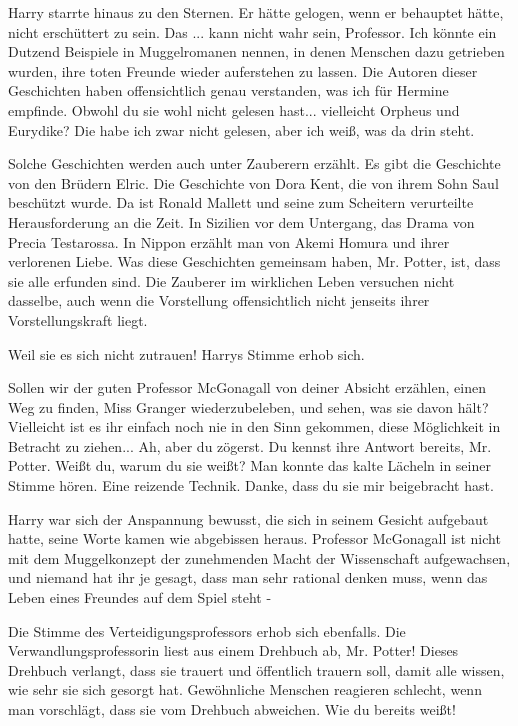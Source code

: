 Harry starrte hinaus zu den Sternen. Er hätte gelogen, wenn er behauptet hätte,
nicht erschüttert zu sein. \glqq{}Das ... kann nicht wahr sein, Professor. Ich
könnte ein Dutzend Beispiele in Muggelromanen nennen, in denen Menschen dazu
getrieben wurden, ihre toten Freunde wieder auferstehen zu lassen. Die Autoren
dieser Geschichten haben offensichtlich genau verstanden, was ich für Hermine
empfinde. Obwohl du sie wohl nicht gelesen hast... vielleicht Orpheus und
Eurydike? Die habe ich zwar nicht gelesen, aber ich weiß, was da drin
steht.\grqq{}

\glqq{}Solche Geschichten werden auch unter Zauberern erzählt. Es gibt die
Geschichte von den Brüdern Elric. Die Geschichte von Dora Kent, die von ihrem
Sohn Saul beschützt wurde. Da ist Ronald Mallett und seine zum Scheitern
verurteilte Herausforderung an die Zeit. In Sizilien vor dem Untergang, das
Drama von Precia Testarossa. In Nippon erzählt man von Akemi Homura und ihrer
verlorenen Liebe. Was diese Geschichten gemeinsam haben, Mr. Potter, ist, dass
sie alle erfunden sind. Die Zauberer im wirklichen Leben versuchen nicht
dasselbe, auch wenn die Vorstellung offensichtlich nicht jenseits ihrer
Vorstellungskraft liegt.\grqq{}

\glqq{}Weil sie es sich nicht zutrauen!\grqq{} Harrys Stimme erhob sich.

\glqq{}Sollen wir der guten Professor McGonagall von deiner Absicht erzählen,
einen Weg zu finden, Miss Granger wiederzubeleben, und sehen, was sie davon
hält? Vielleicht ist es ihr einfach noch nie in den Sinn gekommen, diese
Möglichkeit in Betracht zu ziehen... Ah, aber du zögerst. Du kennst ihre Antwort
bereits, Mr. Potter. Weißt du, warum du sie weißt?\grqq{} Man konnte das kalte
Lächeln in seiner Stimme hören. \glqq{}Eine reizende Technik. Danke, dass du sie
mir beigebracht hast.\grqq{}

Harry war sich der Anspannung bewusst, die sich in seinem Gesicht aufgebaut
hatte, seine Worte kamen wie abgebissen heraus. \glqq{}Professor McGonagall ist
nicht mit dem Muggelkonzept der zunehmenden Macht der Wissenschaft aufgewachsen,
und niemand hat ihr je gesagt, dass man sehr rational denken muss, wenn das
Leben eines Freundes auf dem Spiel steht -\grqq{}

Die Stimme des Verteidigungsprofessors erhob sich ebenfalls. \glqq{}Die
Verwandlungsprofessorin liest aus einem Drehbuch ab, Mr. Potter! Dieses Drehbuch
verlangt, dass sie trauert und öffentlich trauern soll, damit alle wissen, wie
sehr sie sich gesorgt hat. Gewöhnliche Menschen reagieren schlecht, wenn man
vorschlägt, dass sie vom Drehbuch abweichen. Wie du bereits weißt!\grqq{}

